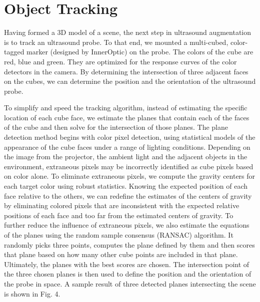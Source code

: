 \documentclass{llncs}
\begin{document}
\section{Object Tracking}
Having formed a 3D model of a scene, the next step in ultrasound augmentation is to track an ultrasound probe. To that end, we mounted a multi-cubed, color-tagged marker (designed by InnerOptic) on the probe.  The colors of the cube are red, blue and green. They are optimized for the response curves of the color detectors in the camera. By determining the intersection of three adjacent faces on the cubes, we can determine the position and the orientation of the ultrasound probe.

To simplify and speed the tracking algorithm, instead of estimating the specific location of each cube face, we estimate the planes that contain each of the faces of the cube and then solve for the intersection of those planes. The plane detection method begins with color pixel detection, using statistical models of the appearance of the cube faces under a range of lighting conditions. Depending on the image from the projector, the ambient light and the adjacent objects in the environment, extraneous pixels may be incorrectly identified as cube pixels based on color alone. To eliminate extraneous pixels, we compute the gravity centers for each target color using robust statistics. Knowing the expected position of each face relative to the others, we can redefine the estimates of the centers of gravity by eliminating colored pixels that are inconsistent with the expected relative positions of each face and too far from the estimated centers of gravity. To further reduce the influence of extraneous pixels, we also estimate the equations of the planes using the random sample consensus (RANSAC) algorithm. It randomly picks three points, computes the plane defined by them and then scores that plane based on how many other cube points are included in that plane. Ultimately, the planes with the best scores are chosen. The intersection point of the three chosen planes is then used to define the position and the orientation of the probe in space. A sample result of three detected planes intersecting the scene is shown in Fig. 4.
\end{document}

